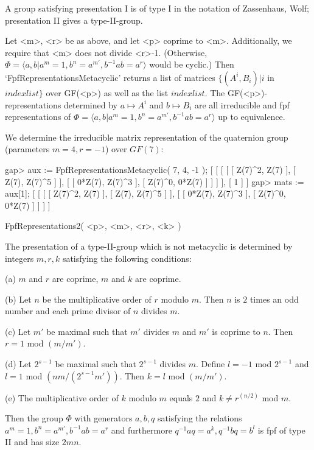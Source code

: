  A group satisfying presentation I is of type I in the notation of Zassenhaus,
 Wolf; presentation II gives a type-II-group.

Let <m>, <r> be as above, and let <p> coprime to <m>.
Additionally, we require that <m> does not divide <r>-1. (Otherwise,
$\Phi = \langle a,b | a^m = 1, b^n = a^{m'}, b^{-1}ab = a^r \rangle$
would be cyclic.) Then
`FpfRepresentationsMetacyclic'
returns a list of matrices $\{ (A^i,B_i) | i$ in $indexlist \}$ over GF(<p>)
as well as the list $indexlist$. The GF(<p>)-representations determined by
$a \mapsto A^i$ and $b \mapsto B_i$ are all irreducible and fpf
representations of
$\Phi = \langle a,b | a^m = 1, b^n = a^{m'}, b^{-1}ab = a^r \rangle$
up to equivalence.

We determine the irreducible matrix representation of the quaternion group
(parameters $m = 4, r = -1$) over $GF(7)$:

\beginexample
    gap> aux := FpfRepresentationsMetacyclic( 7, 4, -1 );
    [ [ [ [ [ Z(7)^2, Z(7) ], [ Z(7), Z(7)^5 ] ], 
              [ [ 0*Z(7), Z(7)^3 ], [ Z(7)^0, 0*Z(7) ] ] ] ], [ 1 ] ]
    gap> mats := aux[1];
    [ [ [ [ Z(7)^2, Z(7) ], [ Z(7), Z(7)^5 ] ], 
          [ [ 0*Z(7), Z(7)^3 ], [ Z(7)^0, 0*Z(7) ] ] ] ]
\endexample

\>FpfRepresentations2( <p>, <m>, <r>, <k> )

 The presentation of a type-II-group which is not metacyclic is determined by
 integers $m,r,k$ satisfying the following conditions:

\beginlist
\item{(a)} $m$ and $r$ are coprime, $m$ and $k$ are coprime.
\item{(b)} Let $n$ be the multiplicative order of $r$ modulo $m$.
 Then $n$ is $2$ times an odd number and each prime divisor of $n$ divides $m$.
\item{(c)} Let $m'$ be maximal such that $m'$ divides $m$ and $m'$ is coprime
 to $n$. Then $r = 1$ mod $(m/m')$.
\item{(d)} Let $2^{s-1}$ be maximal such that $2^{s-1}$ divides $m$. Define
 $l = -1$ mod $2^{s-1}$ and $l = 1$ mod $(nm/(2^{s-1}m'))$.
 Then $k = l$ mod $(m/m')$.
\item{(e)} The multiplicative order of $k$ modulo $m$ equals $2$ and
 $k\neq r^{(n/2)}$ mod $m$. 
\endlist

 Then the group $\Phi$ with generators $a,b,q$ satisfying the
 relations
 $a^m = 1, b^n = a^{m'}, b^{-1}ab = a^r$
 and furthermore
 $q^{-1}a q = a^k, q^{-1}b q = b^l$ is fpf
 of type II and has size $2mn$.

